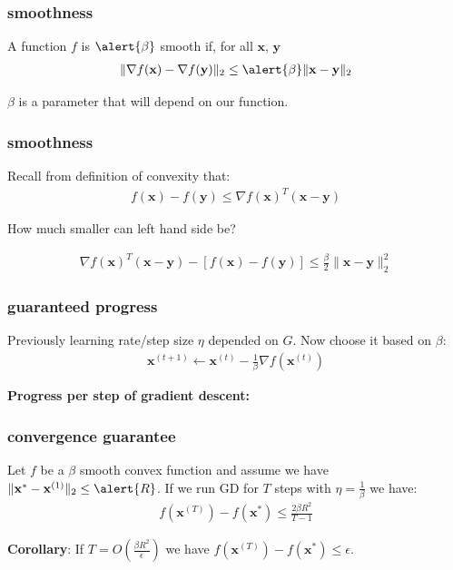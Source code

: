 \documentclass[compress]{beamer}
\newcommand{\bv}[1]{\mathbf{#1}}
\begin{document}
\begin{frame}[t]
	\frametitle{smoothness}
	\begin{definition}
	A function $f$ is $\alert{\beta}$ smooth if, for all $\bv{x}$, $\bv{y}$
	\begin{align*}
		\|\nabla f(\bv{x}) - \nabla f(\bv{y})\|_2 \leq \alert{\beta} \|\bv{x} - \bv{y}\|_2
	\end{align*}
	\end{definition}
	$\beta$ is a parameter that will depend on our function.
\end{frame}

\begin{frame}[t]
	\frametitle{smoothness}
	Recall from definition of convexity that:
	\begin{align*}
	f(\bv{x}) - f(\bv{y}) \leq \nabla f(\bv{x})^T(\bv{x} - \bv{y})
	\end{align*}
	\begin{center}
		\alert{How much smaller can left hand side be?}
	\end{center}
	\begin{align*}
		\nabla f(\bv{x})^T(\bv{x} - \bv{y}) - \left[f(\bv{x}) - f(\bv{y})\right] \leq \frac{\beta}{2}\|\bv{x} - \bv{y}\|_2^2
	\end{align*}
\end{frame}

\begin{frame}[t]
	\frametitle{guaranteed progress}
	Previously learning rate/step size $\eta$ depended on $G$. Now choose it based on $\beta$:
	\begin{align*}
	\bv{x}^{(t+1)} \leftarrow \bv{x}^{(t)} - \frac{1}{\beta}\nabla f(\bv{x}^{(t)})
	\end{align*}
	
	\textbf{Progress per step of gradient descent:}
\end{frame}

\begin{frame}[t]
	\frametitle{convergence guarantee}
	\begin{theorem}
		Let $f$ be a \alert{$\beta$} smooth convex function and assume we have $\|\bv{x}^{*} - \bv{x}^{(1)}\|_2 \leq \alert{R}$. If we run GD for $T$ steps with $\eta = \frac{1}{\beta}$ we have:
		\begin{align*}
		f(\bv{x}^{(T)}) - f(\bv{x}^*) \leq \frac{2\beta R^2}{T-1} 
		\end{align*} 
	\end{theorem}
	\textbf{Corollary}: If \alert{$T = O\left(\frac{\beta R^2}{\epsilon}\right)$} we have $f(\bv{x}^{(T)}) - f(\bv{x}^*) \leq \epsilon$.
\end{frame}
\end{document}
